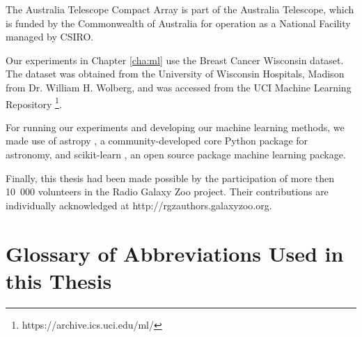   The Australia Telescope Compact Array is part of the Australia Telescope,
  which is funded by the Commonwealth of Australia for operation as a National
  Facility managed by CSIRO.

  Our experiments in Chapter \ref{cha:ml} use the Breast Cancer Wisconsin
  dataset. The dataset was obtained from the University of Wisconsin Hospitals,
  Madison from Dr. William H. Wolberg, and was accessed from the UCI Machine
  Learning Repository \footnote{https://archive.ics.uci.edu/ml/}.

  For running our experiments and developing our machine learning methods, we
  made use of astropy \citep{astropy}, a community-developed core Python package
  for astronomy, and scikit-learn \citep{scikit-learn}, an open source package
  machine learning package.

  Finally, this thesis had been made possible by the participation of more then
  10~000 volunteers in the Radio Galaxy Zoo project. Their contributions are
  individually acknowledged at http://rgzauthors.galaxyzoo.org.

\section{Glossary of Abbreviations Used in this Thesis}
  
